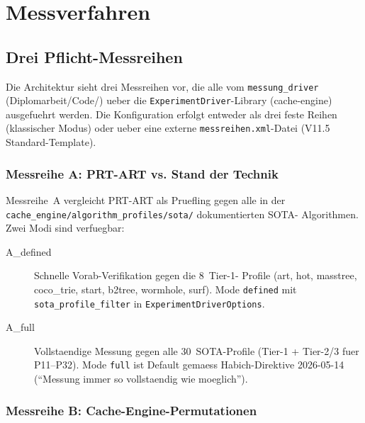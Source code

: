 \chapter{Messverfahren}\label{ch:messverfahren}


\section{Drei Pflicht-Messreihen}

Die Architektur sieht drei Messreihen vor, die alle vom
\texttt{messung\_driver} (Diplomarbeit/Code/) ueber die
\texttt{ExperimentDriver}-Library (cache-engine) ausgefuehrt werden.
Die Konfiguration erfolgt entweder als drei feste Reihen
(klassischer Modus) oder ueber eine externe
\texttt{messreihen.xml}-Datei (V11.5 Standard-Template).

\subsection{Messreihe A: PRT-ART vs. Stand der Technik}

Messreihe~A vergleicht PRT-ART als Pruefling gegen alle in der
\texttt{cache\_engine/algorithm\_profiles/sota/} dokumentierten SOTA-
Algorithmen. Zwei Modi sind verfuegbar:

\begin{description}
    \item[A\_defined] Schnelle Vorab-Verifikation gegen die 8~Tier-1-
          Profile (art, hot, masstree, coco\_trie, start, b2tree,
          wormhole, surf). Mode \texttt{defined} mit
          \texttt{sota\_profile\_filter} in
          \texttt{ExperimentDriverOptions}.
    \item[A\_full] Vollstaendige Messung gegen alle 30~SOTA-Profile
          (Tier-1 + Tier-2/3 fuer P11--P32). Mode \texttt{full} ist
          Default gemaess Habich-Direktive 2026-05-14
          (``Messung immer so vollstaendig wie moeglich'').
\end{description}

\subsection{Messreihe B: Cache-Engine-Permutationen}

